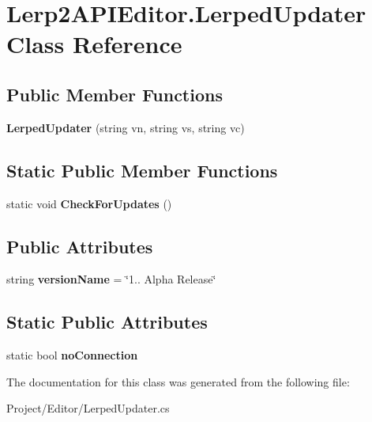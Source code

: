 \hypertarget{class_lerp2_a_p_i_editor_1_1_lerped_updater}{}\section{Lerp2\+A\+P\+I\+Editor.\+Lerped\+Updater Class Reference}
\label{class_lerp2_a_p_i_editor_1_1_lerped_updater}
\subsection*{Public Member Functions}
\begin{DoxyCompactItemize}
\item 
\mbox{\label{class_lerp2_a_p_i_editor_1_1_lerped_updater_a7b76ab00342f20c44ce74977f713a60f}} 
{\bfseries Lerped\+Updater} (string vn, string vs, string vc)
\end{DoxyCompactItemize}
\subsection*{Static Public Member Functions}
\begin{DoxyCompactItemize}
\item 
\mbox{\label{class_lerp2_a_p_i_editor_1_1_lerped_updater_ae973640f5a7a8da997f8e98c3ad8994d}} 
static void {\bfseries Check\+For\+Updates} ()
\end{DoxyCompactItemize}
\subsection*{Public Attributes}
\begin{DoxyCompactItemize}
\item 
\mbox{\label{class_lerp2_a_p_i_editor_1_1_lerped_updater_ac8af4e9eef48f6d67090e5a8c015e383}} 
string {\bfseries version\+Name} = \char`\"{}1.. Alpha Release\char`\"{}
\end{DoxyCompactItemize}
\subsection*{Static Public Attributes}
\begin{DoxyCompactItemize}
\item 
\mbox{\label{class_lerp2_a_p_i_editor_1_1_lerped_updater_a64bb670cd57ee4078cf1835934cb870a}} 
static bool {\bfseries no\+Connection}
\end{DoxyCompactItemize}


The documentation for this class was generated from the following file\+:\begin{DoxyCompactItemize}
\item 
Project/\+Editor/Lerped\+Updater.\+cs\end{DoxyCompactItemize}
